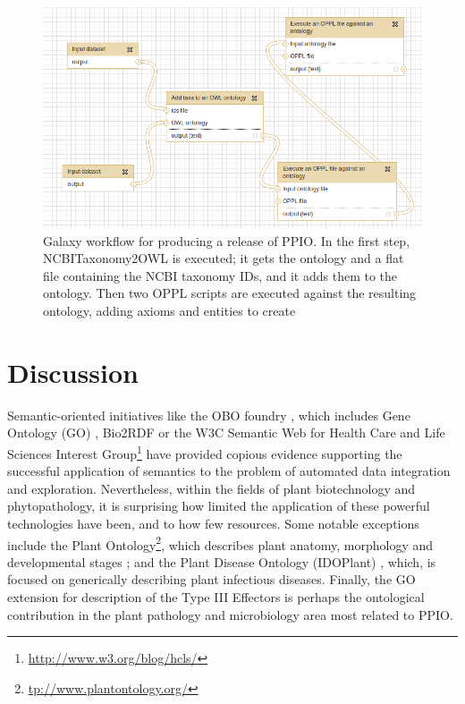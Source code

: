 \documentclass[sw]{iosart2c}
\newcommand{\myurl}[1]{\footnote{\url{#1}}}
\begin{document}
\begin{figure}
\includegraphics{galaxy-workflow.png}
\caption{Galaxy workflow for producing a release of PPIO. In the first step, NCBITaxonomy2OWL is executed; it gets the ontology and a flat file containing the NCBI taxonomy IDs, and it adds them to the ontology. Then two OPPL scripts are executed against the resulting ontology, adding axioms and entities to create }\label{fig:galaxy-workflow}
\end{figure}


\section{Discussion}\label{sec:discussion}

Semantic-oriented initiatives like the OBO foundry \cite{Smith}, which includes Gene Ontology (GO) \cite{Gene}, Bio2RDF \cite{RDF} or the W3C Semantic Web for Health Care and Life Sciences Interest Group\myurl{http://www.w3.org/blog/hcls/} have provided copious evidence supporting the successful application of semantics to the problem of automated data integration and exploration. Nevertheless, within the fields of plant biotechnology and phytopathology, it is surprising how limited the application of these powerful technologies have been, and to how few resources.  Some notable exceptions include the Plant Ontology\myurl{tp://www.plantontology.org/}, which describes plant anatomy, morphology and developmental stages \cite{PO}; and the Plant Disease Ontology (IDOPlant) \cite{Walls} \cite{IDO}, which, is focused on generically describing plant infectious diseases. Finally, the GO extension for description of the Type III Effectors \cite{Lindeberg} is perhaps the ontological contribution in the plant pathology and microbiology area most related to PPIO.
\end{document}
